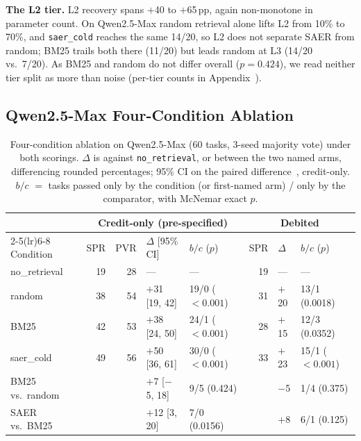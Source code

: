 \documentclass[letterpaper]{article} %
\newcommand{\appref}[1]{Appendix~\getrefnumber{#1}}
\begin{document}
\noindent\textbf{The L2 tier.}  L2 recovery spans $+$40 to $+$65\,pp, again
non-monotone in parameter count.  On Qwen2.5-Max random retrieval alone lifts
L2 from 10\% to 70\%, and \texttt{saer\_cold} reaches the same 14/20, so L2
does not separate SAER from random; BM25 trails both there (11/20) but leads
random at L3 (14/20 vs.\ 7/20).  As BM25 and random do not differ overall
($p{=}0.424$), we read neither tier split as more than noise (per-tier counts
in \appref{app:perseed}).

\subsection{Qwen2.5-Max Four-Condition Ablation}
\label{sec:ablation}

\begin{table}[htbp]
\vspace{-8pt}
\caption{Four-condition ablation on Qwen2.5-Max (60 tasks, 3-seed majority
vote) under both scorings.  $\Delta$ is against \texttt{no\_retrieval}, or
between the two named arms, differencing rounded percentages; 95\% CI on the
paired difference~\citep{newcombe1998improved}, credit-only.  $b/c$ $=$
tasks passed only by the condition (or first-named arm) / only by the
comparator, with McNemar exact $p$.}
\label{tab:ablation}
\footnotesize\setlength{\tabcolsep}{4pt}
\centering
\begin{tabular}{lrrllrll}
\toprule
& \multicolumn{4}{c}{Credit-only (pre-specified)} & \multicolumn{3}{c}{Debited} \\
\cmidrule(lr){2-5}\cmidrule(lr){6-8}
Condition & SPR & PVR & $\Delta$ [95\% CI] & $b/c$ ($p$) & SPR & $\Delta$ & $b/c$ ($p$) \\
\midrule
no\_retrieval & 19 & 28 & --- & --- & 19 & --- & --- \\
random        & 38 & 54 & $+$31 [19, 42] & 19/0 (${<}0.001$) & 31 & $+$20 & 13/1 (0.0018) \\
BM25          & 42 & 53 & $+$38 [24, 50] & 24/1 (${<}0.001$) & 28 & $+$15 & 12/3 (0.0352) \\
saer\_cold    & 49 & 56 & $+$50 [36, 61] & 30/0 (${<}0.001$) & 33 & $+$23 & 15/1 (${<}0.001$) \\
\midrule
BM25 vs.\ random   & & & $+$7 [$-$5, 18] & 9/5 (0.424)  & & $-$5 & 1/4 (0.375) \\
SAER vs.\ BM25     & & & $+$12 [3, 20]   & 7/0 (0.0156) & & $+$8 & 6/1 (0.125) \\
\bottomrule
\end{tabular}
\end{table}
\end{document}
